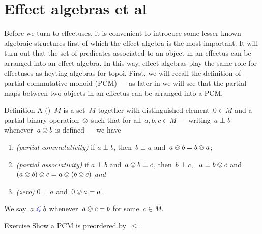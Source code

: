\documentclass[b]{subfiles}
\begin{document}
\section{Effect algebras et al}
\begin{parsec}%
\begin{point}%
Before we turn to effectuses,
    it is convenient to introcuce some lesser-known algebraic structures first
    of which the effect algebra is the most important.
It will turn out that the set of predicates associated to an object in
    an effectus can be arranged into an effect algebra.
In this way, effect algebras play the same role
    for effectuses as heyting algebras for topoi.
    First, we will recall the definition of partial commutative monoid (PCM)
    --- as later in  
    we will see that the partial maps between
    two objects in an effectus can be arranged into a PCM.
\end{point}
\begin{point}{Definition}%
    A  ()~$M$
        is a set~$M$ together with distinguished element~$0 \in M$
        and a partial binary operation~$\ovee$ such that
        for all~$a,b,c \in M$ 
        --- writing~$a \perp b$ whenever~$a \ovee b$ is defined
        --- we have
\begin{enumerate}
    \item \emph{(partial commutativity)}
        if $a \perp b$, then~$b \perp a$ and~$a \ovee b = b \ovee a$;
    \item \emph{(partial associativity)}
        if $a \perp b$ and~$a \ovee b \perp c$,
        then~$b \perp c$, ~$a \perp b \ovee c$
            and~$(a \ovee b) \ovee c = a \ovee (b \ovee c)$ \emph{and}
    \item \emph{(zero)}
        $0 \perp a$ and~$0 \ovee a = a$.
\end{enumerate}
We say~$a\mathrel{\Define{\leq}} b$
    whenever~$a \ovee c = b$ for some~$c \in M$.
\end{point}
\begin{point}{Exercise}%
Show a PCM is preordered by~$\leq$.
\end{point}
\end{parsec}
\end{document}
